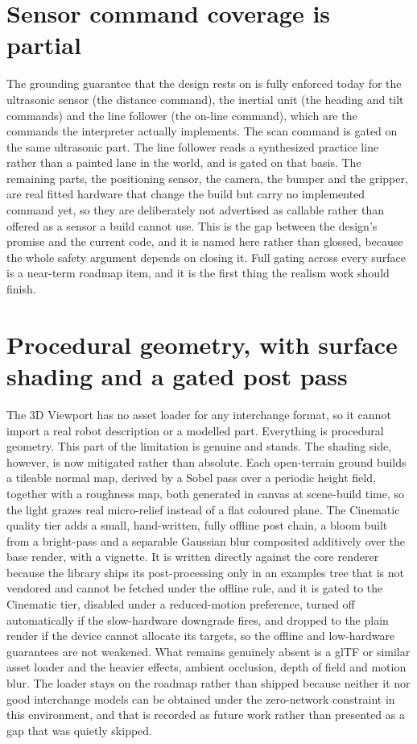 \documentclass[11pt,a4paper]{report}
\begin{document}
\section{Sensor command coverage is partial}
The grounding guarantee that the design rests on is fully enforced today for the ultrasonic sensor (the distance command), the inertial unit (the heading and tilt commands) and the line follower (the on-line command), which are the commands the interpreter actually implements. The scan command is gated on the same ultrasonic part. The line follower reads a synthesized practice line rather than a painted lane in the world, and is gated on that basis. The remaining parts, the positioning sensor, the camera, the bumper and the gripper, are real fitted hardware that change the build but carry no implemented command yet, so they are deliberately not advertised as callable rather than offered as a sensor a build cannot use. This is the gap between the design's promise and the current code, and it is named here rather than glossed, because the whole safety argument depends on closing it. Full gating across every surface is a near-term roadmap item, and it is the first thing the realism work should finish.

\section{Procedural geometry, with surface shading and a gated post pass}
The 3D Viewport has no asset loader for any interchange format, so it cannot import a real robot description or a modelled part. Everything is procedural geometry. This part of the limitation is genuine and stands. The shading side, however, is now mitigated rather than absolute. Each open-terrain ground builds a tileable normal map, derived by a Sobel pass over a periodic height field, together with a roughness map, both generated in canvas at scene-build time, so the light grazes real micro-relief instead of a flat coloured plane. The Cinematic quality tier adds a small, hand-written, fully offline post chain, a bloom built from a bright-pass and a separable Gaussian blur composited additively over the base render, with a vignette. It is written directly against the core renderer because the library ships its post-processing only in an examples tree that is not vendored and cannot be fetched under the offline rule, and it is gated to the Cinematic tier, disabled under a reduced-motion preference, turned off automatically if the slow-hardware downgrade fires, and dropped to the plain render if the device cannot allocate its targets, so the offline and low-hardware guarantees are not weakened. What remains genuinely absent is a glTF or similar asset loader and the heavier effects, ambient occlusion, depth of field and motion blur. The loader stays on the roadmap rather than shipped because neither it nor good interchange models can be obtained under the zero-network constraint in this environment, and that is recorded as future work rather than presented as a gap that was quietly skipped.
\end{document}
